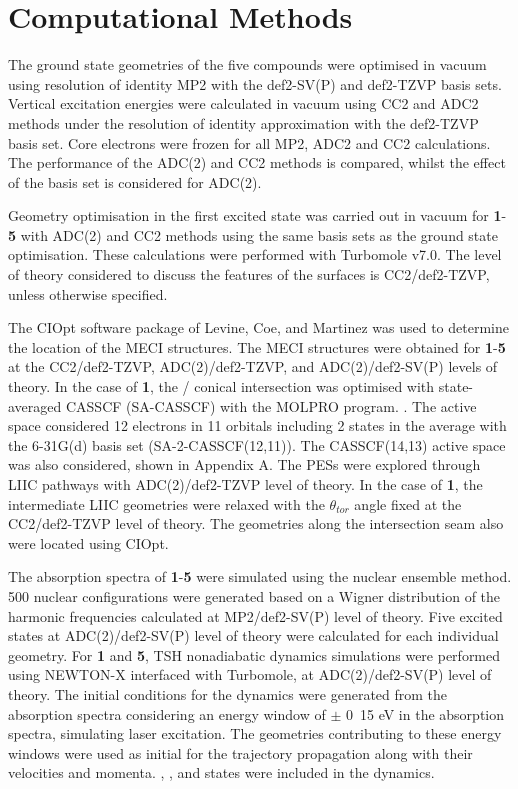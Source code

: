 \section{Computational Methods}\label{section: NRdecay_methods}
The ground state geometries of the five compounds were optimised in vacuum using resolution of identity \acf{MP2} with the def2-SV(P) and def2-TZVP basis sets.\cite{Haase1993,Schafer1992,Weigend2005} Vertical excitation energies were calculated in vacuum using CC2 and \ac{ADC2} methods under the resolution of identity approximation with the def2-TZVP basis set.\cite{Christiansen1995,Hattig2000,Hattig2002,Kohn2003,Hattig2005} Core electrons were frozen for all \ac{MP2}, \ac{ADC2} and CC2 calculations. The performance of the ADC(2) and CC2 methods is compared, whilst the effect of the basis set is considered for ADC(2). 

Geometry optimisation in the first excited state was carried out in vacuum for \textbf{1}-\textbf{5} with ADC(2) and CC2 methods using the same basis sets as the ground state optimisation. These calculations were performed with Turbomole v7.0.\cite{Turbomole} The level of theory considered to discuss the features of the surfaces is CC2/def2-TZVP, unless otherwise specified.

The CIOpt software package of Levine, Coe, and Martinez was used to determine the location of the \acf{MECI} structures.\cite{Levine2008} The MECI structures were obtained for \textbf{1}-\textbf{5} at the CC2/def2-TZVP, ADC(2)/def2-TZVP, and ADC(2)/def2-SV(P) levels of theory. In the case of \textbf{1}, the \sone/\szero{} conical intersection was optimised with state-averaged CASSCF (SA-CASSCF) with the MOLPRO program.\cite{Molpro} . The active space considered 12 electrons in 11 orbitals including 2 states in the average with the 6-31G(d) basis set (SA-2-CASSCF(12,11)). The CASSCF(14,13) active space was also considered, shown in Appendix A. The \acp{PES} were explored through \ac{LIIC} pathways with ADC(2)/def2-TZVP level of theory. In the case of \textbf{1}, the intermediate \ac{LIIC} geometries were relaxed with the $\theta_{tor}$ angle fixed at the CC2/def2-TZVP level of theory. The geometries along the intersection seam also were located using CIOpt. 

The absorption spectra of \textbf{1}-\textbf{5} were simulated using the nuclear ensemble method. 500 nuclear configurations were generated based on a Wigner distribution of the harmonic frequencies calculated at MP2/def2-SV(P) level of theory.\cite{Crespo-Otero2012} Five excited states at ADC(2)/def2-SV(P) level of theory were calculated for each individual geometry. For \textbf{1} and \textbf{5}, \acf{TSH} nonadiabatic dynamics simulations were performed using NEWTON-X interfaced with Turbomole, at ADC(2)/def2-SV(P) level of theory.\cite{Barbatti2014} The initial conditions for the dynamics were generated from the absorption spectra considering an energy window of $\pm$ \si{0.15} {eV} in the absorption spectra, simulating laser excitation.\cite{Barbatti2007} The geometries contributing to these energy windows were used as initial for the trajectory propagation along with their velocities and momenta. \szero{}, \sone{}, and \stwo{} states were included in the dynamics. 

